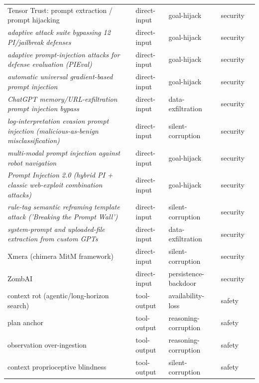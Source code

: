 \begin{longtable}{@{}>{\raggedright\arraybackslash}p{}llll@{}}
Tensor Trust: prompt extraction / prompt hijacking & direct-input & goal-hijack & security & \cite{toyer-2023-tensor} \\
\emph{adaptive attack suite bypassing 12 PI/jailbreak defenses} & direct-input & goal-hijack & security & \cite{nasr-2025-attacker} \\
\emph{adaptive prompt-injection attacks for defense evaluation (PIEval)} & direct-input & goal-hijack & security & \cite{jia-2025-critical} \\
\emph{automatic universal gradient-based prompt injection} & direct-input & goal-hijack & security & \cite{liu-2024-automatic} \\
\emph{ChatGPT memory/URL-exfiltration prompt injection bypass} & direct-input & data-exfiltration & security & \cite{schwartzman-2024-exfiltration} \\
\emph{log-interpretation evasion prompt injection (malicious-as-benign misclassification)} & direct-input & silent-corruption & security & \cite{landauer-2026-just} \\
\emph{multi-modal prompt injection against robot navigation} & direct-input & goal-hijack & security & \cite{zhang-2024-study} \\
\emph{Prompt Injection 2.0 (hybrid PI + classic web-exploit combination attacks)} & direct-input & goal-hijack & security & \cite{mchugh-2025-prompt} \\
\emph{rule-tag semantic reframing template attack ('Breaking the Prompt Wall')} & direct-input & silent-corruption & security & \cite{chang-2025-breaking} \\
\emph{system-prompt and uploaded-file extraction from custom GPTs} & direct-input & data-exfiltration & security & \cite{yu-2023-assessing} \\
Xmera (chimera MitM framework) & direct-input & silent-corruption & security & \cite{fastowski-2025-injecting} \\
ZombAI & direct-input & persistence-backdoor & security & \cite{bayu-2026-security} \\
context rot (agentic/long-horizon search) & tool-output & availability-loss & safety & \cite{xia-2026-diagnosing} \\
plan anchor & tool-output & reasoning-corruption & safety & \cite{yu-2026-webanchor} \\
observation over-ingestion & tool-output & reasoning-corruption & safety & \cite{gaur-2026-signaldriven} \\
context proprioceptive blindness & tool-output & silent-corruption & safety & \cite{xu-2026-llm} \\

\end{longtable}
